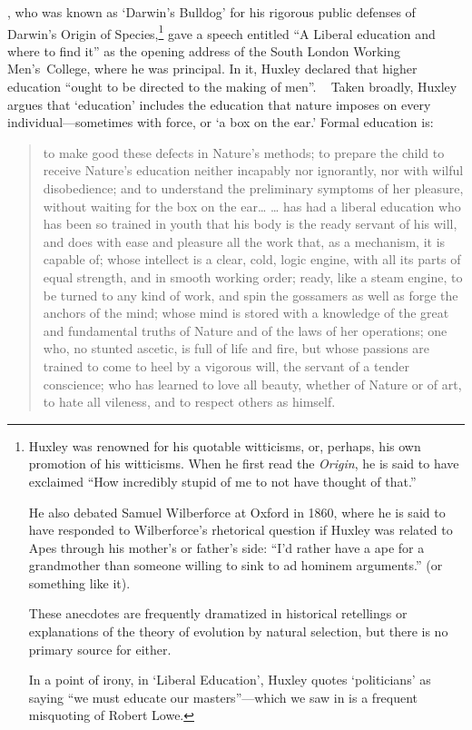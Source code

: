 , who was known as `Darwin's Bulldog' for his rigorous public defenses of Darwin's Origin of Species,\footnote{Huxley was renowned for his quotable witticisms, or, perhaps, his own promotion of his witticisms. When he first read the \emph{Origin}, he is said to have exclaimed ``How incredibly stupid of me to not have thought of that.'' 

He also debated Samuel Wilberforce at Oxford in 1860, where he is said to have responded to Wilberforce's rhetorical question if Huxley was related to Apes through his mother's or father's side: ``I'd rather have a ape for a grandmother than someone willing to sink to ad hominem arguments.'' (or something like it). 

These anecdotes are frequently dramatized in historical retellings or explanations of the theory of evolution by natural selection, but there is no primary source for either.

In a point of irony, in `Liberal Education', Huxley quotes `politicians' as saying ``we must educate our masters''---which we saw in  is a frequent misquoting of Robert Lowe.} gave a speech entitled ``A Liberal education and where to find it'' as the opening address of the South London Working Men's College, where he was principal. In it, Huxley declared that higher education ``ought to be directed to the making of men''. ~\citep{Huxley:2009ty} Taken broadly, Huxley argues that `education' includes the education that nature imposes on every individual---sometimes with force, or `a box on the ear.' Formal education is:

\begin{quote}

to make good these defects in Nature's methods; to prepare the child to receive Nature's education neither incapably nor ignorantly, nor with wilful disobedience; and to understand the preliminary symptoms of her pleasure, without waiting for the box on the ear{\ldots} {\ldots} has had a liberal education who has been so trained in youth that his body is the ready servant of his will, and does with ease and pleasure all the work that, as a mechanism, it is capable of; whose intellect is a clear, cold, logic engine, with all its parts of equal strength, and in smooth working order; ready, like a steam engine, to be turned to any kind of work, and spin the gossamers as well as forge the anchors of the mind; whose mind is stored with a knowledge of the great and fundamental truths of Nature and of the laws of her operations; one who, no stunted ascetic, is full of life and fire, but whose passions are trained to come to heel by a vigorous will, the servant of a tender conscience; who has learned to love all beauty, whether of Nature or of art, to hate all vileness, and to respect others as himself. ~\citep[p. 85--86]{Huxley:2009ty}
\end{quote}


